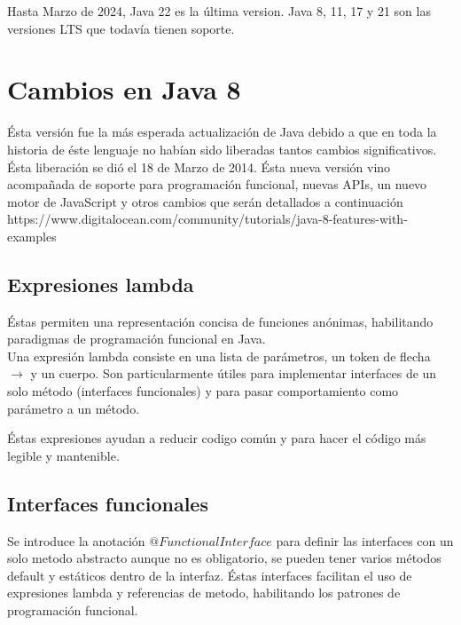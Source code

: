 \documentclass[12pt,article,oneside]{memoir}
\begin{document}
	Hasta Marzo de 2024, Java 22 es la \'ultima version. Java 8, 11, 17 y 21 son las versiones LTS que todav\'ia 
	tienen soporte.\\
	
	
		\section{Cambios en Java 8}
		\'Esta versi\'on fue la m\'as esperada actualizaci\'on de Java debido a que en toda la historia de \'este lenguaje 
		no hab\'ian sido liberadas tantos cambios significativos. \'Esta liberaci\'on se di\'o el 18 de Marzo de 2014. \'Esta 
		nueva versi\'on vino acompa\~nada de soporte para programaci\'on funcional, nuevas APIs, un nuevo motor de JavaScript 
		y otros cambios que ser\'an detallados a continuaci\'on \\
		
		https://www.digitalocean.com/community/tutorials/java-8-features-with-examples\\
			
			\subsection{Expresiones lambda}
			\'Estas permiten una representaci\'on concisa de funciones an\'onimas, habilitando paradigmas de programaci\'on 
			funcional en Java.\\
			
			Una expresi\'on lambda consiste en una lista de par\'ametros, un token de flecha $\rightarrow$ y un cuerpo. Son 
			particularmente  \'utiles para implementar interfaces de un solo m\'etodo (interfaces funcionales) y para pasar
			comportamiento como par\'ametro a un m\'etodo.
			
			\'Estas expresiones ayudan a reducir codigo com\'un y para hacer el c\'odigo m\'as legible y mantenible.
			
			\subsection{Interfaces funcionales}
			Se introduce la anotaci\'on $@FunctionalInterface$ para definir las interfaces con un solo metodo abstracto aunque
			no es obligatorio, se pueden tener varios m\'etodos default y est\'aticos dentro de la interfaz. \'Estas interfaces 
			facilitan el uso de expresiones lambda y referencias de metodo, habilitando los patrones de programaci\'on 
			funcional.\\
			
\end{document}
